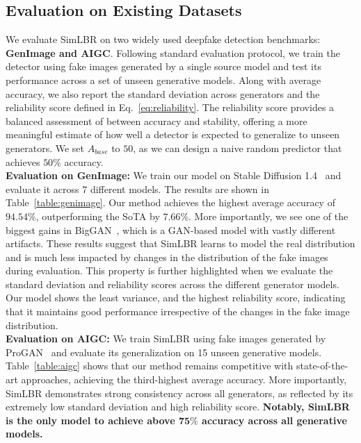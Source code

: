 \subsection{Evaluation on Existing Datasets}
We evaluate SimLBR on two widely used deepfake detection benchmarks: \textbf{GenImage and AIGC}. Following standard evaluation protocol, we train the detector using fake images generated by a single source model and test its performance across a set of unseen generative models. Along with average accuracy, we also report the standard deviation across generators and the reliability score defined in Eq.~\ref{eq:reliability}. The reliability score provides a balanced assessment of between accuracy and stability, offering a more meaningful estimate of how well a detector is expected to generalize to unseen generators. We set $A_{base}$ to $50$, as we can design a naive random predictor that achieves $50\%$ accuracy. 
\\
\noindent \textbf{Evaluation on GenImage: }We train our model on Stable Diffusion 1.4~\cite{rombach2022high} and evaluate it across 7 different models. The results are shown in Table~\ref{table:genimage}. Our method achieves the highest average accuracy of $94.54\%$, outperforming the SoTA by $7.66\%$. More importantly, we see one of the biggest gains in BigGAN~\cite{brock2018large}, which is a GAN-based model with vastly different artifacts. These results suggest that SimLBR learns to model the real distribution and is much less impacted by changes in the distribution of the fake images during evaluation. This property is further highlighted when we evaluate the standard deviation and reliability scores across the different generator models. Our model shows the least variance, and the highest reliability score, indicating that it maintains good performance irrespective of the changes in the fake image distribution.
\\
\noindent\textbf{Evaluation on AIGC: }We train SimLBR using fake images generated by ProGAN~\cite{karras2017progressive} and evaluate its generalization on 15 unseen generative models. Table~\ref{table:aigc} shows that our method remains competitive with state-of-the-art approaches, achieving the third-highest average accuracy. More importantly, SimLBR demonstrates strong consistency across all generators, as reflected by its extremely low standard deviation and high reliability score. \textbf{Notably, SimLBR is the only model to achieve above $\bm{75\%}$ accuracy across all generative models.} 

